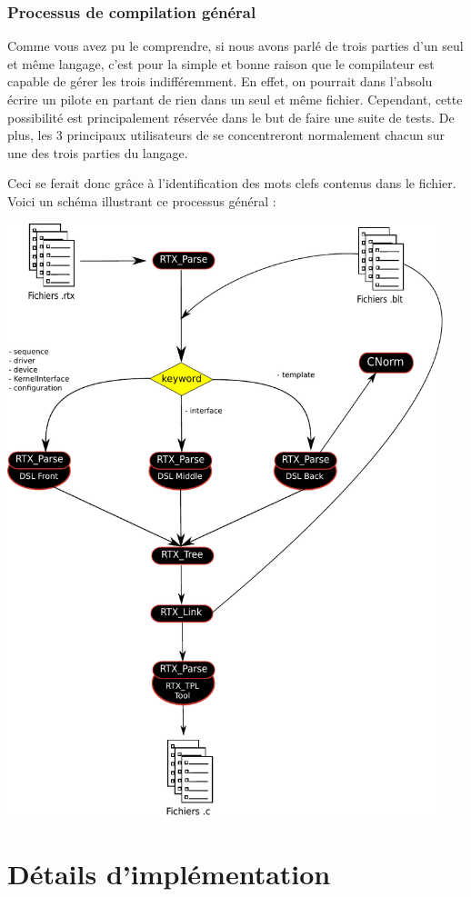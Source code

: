 \documentclass[french]{rtxreport}
\begin{document}
\subsection{Processus de compilation général}

Comme vous avez pu le comprendre, si nous avons parlé de trois parties d'un
seul et même langage, c'est pour la simple et bonne raison que le compilateur
est capable de gérer les trois indifféremment. En effet, on pourrait dans
l'absolu écrire un pilote en partant de rien dans un seul et même fichier.
Cependant, cette possibilité est principalement réservée dans le but de faire
une suite de tests. De plus, les 3 principaux utilisateurs de \rtx se
concentreront normalement chacun sur une des trois parties du langage.

Ceci se ferait donc grâce à l'identification des mots clefs contenus dans le
fichier. Voici un schéma illustrant ce processus général :

\includegraphics[width=0.95\textwidth]{logigramme.pdf}



\chapter{Détails d'implémentation}
\end{document}
